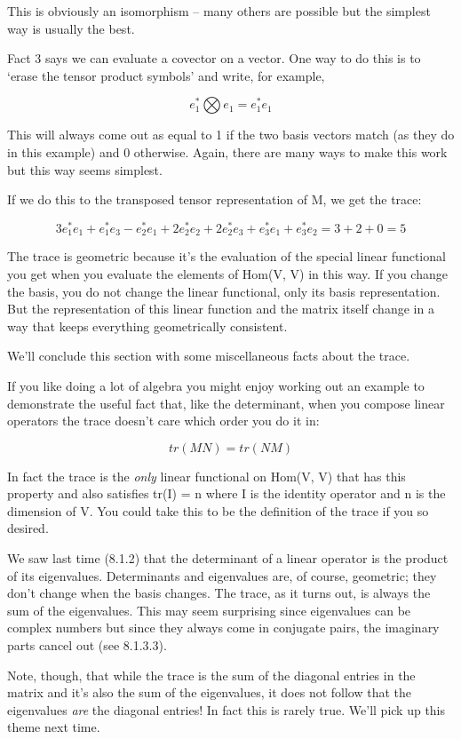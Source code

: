 \documentclass[oneside,english]{amsbook}
\numberwithin{section}{chapter}
\theoremstyle{plain}
\theoremstyle{definition}
\begin{document}
This is obviously an isomorphism -- many others are possible but the
simplest way is usually the best.

Fact 3 says we can evaluate a covector on a vector. One way to do this
is to `erase the tensor product symbols' and write, for example,

\[e_{1}^{*}\bigotimes e_{1} = e_{1}^{*}e_{1}\]

This will always come out as equal to 1 if the two basis vectors match
(as they do in this example) and 0 otherwise. Again, there are many ways
to make this work but this way seems simplest.

If we do this to the transposed tensor representation of M, we get the
trace:

\[3e_{1}^{*}e_{1} + e_{1}^{*}e_{3} - e_{2}^{*}e_{1} + 2e_{2}^{*}e_{2} + 2e_{2}^{*}e_{3} + e_{3}^{*}e_{1} + e_{3}^{*}e_{2} = 3 + 2 + 0 = 5\]

The trace is geometric because it's the evaluation of the special linear
functional you get when you evaluate the elements of Hom(V, V) in this
way. If you change the basis, you do not change the linear functional,
only its basis representation. But the representation of this linear
function and the matrix itself change in a way that keeps everything
geometrically consistent.

We'll conclude this section with some miscellaneous facts about the
trace.

If you like doing a lot of algebra you might enjoy working out an
example to demonstrate the useful fact that, like the determinant, when
you compose linear operators the trace doesn't care which order you do
it in:

\[tr(MN) = tr(NM)\]

In fact the trace is the \emph{only} linear functional on Hom(V, V) that
has this property and also satisfies tr(I) = n where I is the identity
operator and n is the dimension of V. You could take this to be the
definition of the trace if you so desired.

We saw last time (8.1.2) that the determinant of a linear operator is
the product of its eigenvalues. Determinants and eigenvalues are, of
course, geometric; they don't change when the basis changes. The trace,
as it turns out, is always the sum of the eigenvalues. This may seem
surprising since eigenvalues can be complex numbers but since they
always come in conjugate pairs, the imaginary parts cancel out (see
8.1.3.3).

Note, though, that while the trace is the sum of the diagonal entries in
the matrix and it's also the sum of the eigenvalues, it does not follow
that the eigenvalues \emph{are} the diagonal entries! In fact this is
rarely true. We'll pick up this theme next time.
\end{document}
